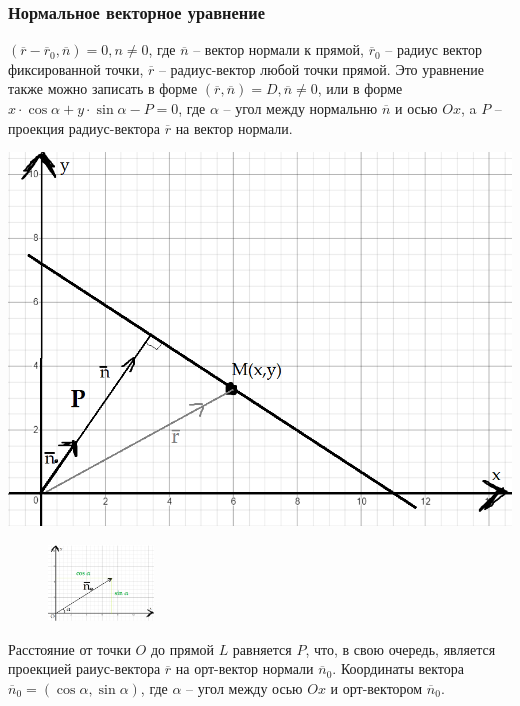 \documentclass{article}
\begin{document}
\subsubsection{Нормальное векторное уравнение}
$(\overline{r} - \overline{r}_0, \overline{n}) = 0, n \neq 0$, где $\overline{n}$ -- вектор нормали к прямой, $\overline{r}_0$ -- радиус вектор
фиксированной точки, $\overline{r}$ -- радиус-вектор любой точки прямой. Это уравнение также можно записать в форме $(\overline{r}, \overline{n}) = D, \overline{n} \neq 0$, или в форме $x\cdot\cos\alpha+y\cdot\sin\alpha-P=0$, где $\alpha$ -- угол между нормальню $\overline{n}$ и осью $Ox$, a $P$ -- проекция радиус-вектора $\overline{r}$ на вектор нормали.
\newline
\newpage
\begin{center}
    \includegraphics[scale=0.5]{pic.png}
\end{center}
\begin{figure}
    \centering
    \includegraphics[width=0.25\textwidth]{pci2.png}
\end{figure}

Расстояние от точки $O$ до прямой $L$ равняется $P$, что, в свою очередь, является проекцией раиус-вектора $\overline{r}$ на орт-вектор нормали $\overline{n}_0$. Координаты вектора $\overline{n}_0=(\cos\alpha,\sin\alpha)$, где $\alpha$ -- угол между осью $Ox$ и орт-вектором $\overline{n}_0$.
\end{document}
